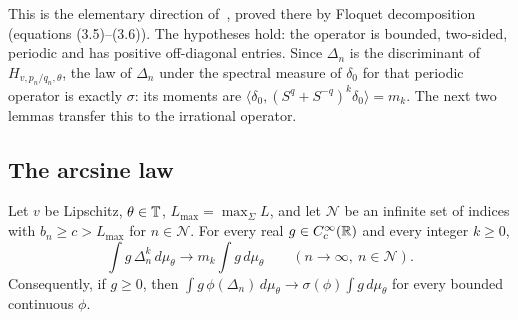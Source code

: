 This is the elementary direction of~\cite[Theorem~3.1]{DKS2010}, proved there by Floquet decomposition (equations (3.5)--(3.6)). The hypotheses hold: the operator is bounded, two-sided, periodic and has positive off-diagonal entries. Since $\Delta_n$ is the discriminant of $H_{v,p_n/q_n,\theta}$, the law of $\Delta_n$ under the spectral measure of $\delta_0$ for that periodic operator is exactly $\sigma$: its moments are $\langle\delta_0,(S^q+S^{-q})^k\delta_0\rangle=m_k$. The next two lemmas transfer this to the irrational operator.

\subsection{The arcsine law}\label{sec:arcsine}

\begin{lemma}\label{lem:arcsine}
Let $v$ be Lipschitz, $\theta\in\mathbb T$, $L_{\max}=\max_\Sigma L$, and let $\mathcal N$ be an infinite set of indices with $b_n\ge c>L_{\max}$ for $n\in\mathcal N$. For every real $g\in C_c^\infty(\mathbb R)$ and every integer $k\ge0$,
\[
\int g\,\Delta_n^k\,d\mu_\theta\to m_k\int g\,d\mu_\theta\qquad(n\to\infty,\ n\in\mathcal N).
\]
Consequently, if $g\ge0$, then $\int g\,\phi(\Delta_n)\,d\mu_\theta\to\sigma(\phi)\int g\,d\mu_\theta$ for every bounded continuous $\phi$.
\end{lemma}


